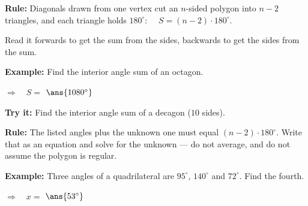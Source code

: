 \documentclass[12pt]{article}
\begin{document}


\begin{formulabox}
\textbf{Rule:} Diagonals drawn from one vertex cut an $n$-sided polygon into $n-2$ triangles, and each triangle holds $180^\circ$:
\ \ $S = (n-2)\cdot 180^\circ$.\par
Read it forwards to get the sum from the sides, backwards to get the sides from the sum.
\end{formulabox}

\begin{examplebox}
\textbf{Example:} \quad Find the interior angle sum of an octagon.

$\Rightarrow\quad S = $ $\ans{1080^\circ}$
\end{examplebox}

\begin{tryitbox}
\textbf{Try it:} \quad Find the interior angle sum of a decagon ($10$ sides).\\[2pt]
\end{tryitbox}


\begin{formulabox}
\textbf{Rule:} The listed angles plus the unknown one must equal $(n-2)\cdot 180^\circ$. Write that as an equation and solve for the unknown --- do not average, and do not assume the polygon is regular.
\end{formulabox}

\begin{examplebox}
\textbf{Example:} \quad Three angles of a quadrilateral are $95^\circ$, $140^\circ$ and $72^\circ$. Find the fourth.

$\Rightarrow\quad x = $ $\ans{53^\circ}$
\end{examplebox}
\end{document}
